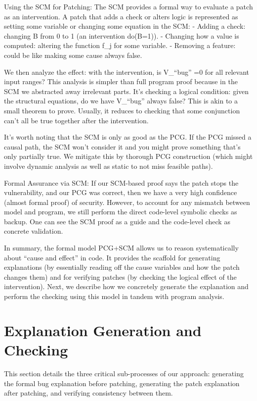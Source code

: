 \documentclass[conference,compsoc]{IEEEtran}
\begin{document}
Using the SCM for Patching: The SCM provides a formal way to evaluate a
patch as an intervention. A patch that adds a check or alters logic is
represented as setting some variable or changing some equation in the
SCM: - Adding a check: changing B from 0 to 1 (an intervention do(B=1)).
- Changing how a value is computed: altering the function f\_j for some
variable. - Removing a feature: could be like making some cause always
false.

We then analyze the effect: with the intervention, is V\_``bug'' =0 for
all relevant input ranges? This analysis is simpler than full program
proof because in the SCM we abstracted away irrelevant parts. It's
checking a logical condition: given the structural equations, do we have
V\_``bug'' always false? This is akin to a small theorem to prove.
Usually, it reduces to checking that some conjunction can't all be true
together after the intervention.

It's worth noting that the SCM is only as good as the PCG. If the PCG
missed a causal path, the SCM won't consider it and you might prove
something that's only partially true. We mitigate this by thorough PCG
construction (which might involve dynamic analysis as well as static to
not miss feasible paths).

Formal Assurance via SCM: If our SCM-based proof says the patch stops
the vulnerability, and our PCG was correct, then we have a very high
confidence (almost formal proof) of security. However, to account for
any mismatch between model and program, we still perform the direct
code-level symbolic checks as backup. One can see the SCM proof as a
guide and the code-level check as concrete validation.

In summary, the formal model PCG+SCM allows us to reason systematically
about ``cause and effect'' in code. It provides the scaffold for
generating explanations (by essentially reading off the cause variables
and how the patch changes them) and for verifying patches (by checking
the logical effect of the intervention). Next, we describe how we
concretely generate the explanation and perform the checking using this
model in tandem with program analysis.

\section{Explanation Generation and
Checking}\label{explanation-generation-and-checking}

This section details the three critical sub-processes of our approach:
generating the formal bug explanation before patching, generating the
patch explanation after patching, and verifying consistency between
them.
\end{document}
